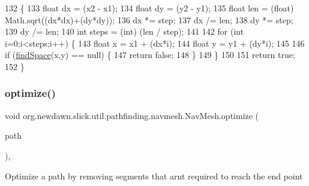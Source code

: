 \begin{DoxyCode}
132                                                                                 \{
133         \textcolor{keywordtype}{float} dx = (x2 - x1);
134         \textcolor{keywordtype}{float} dy = (y2 - y1);
135         \textcolor{keywordtype}{float} len = (float) Math.sqrt((dx*dx)+(dy*dy));
136         dx *= step;
137         dx /= len;
138         dy *= step;
139         dy /= len;
140         \textcolor{keywordtype}{int} steps = (int) (len / step);
141         
142         \textcolor{keywordflow}{for} (\textcolor{keywordtype}{int} i=0;i<steps;i++) \{
143             \textcolor{keywordtype}{float} x = x1 + (dx*i);
144             \textcolor{keywordtype}{float} y = y1 + (dy*i);
145             
146             \textcolor{keywordflow}{if} (\mbox{\hyperlink{classorg_1_1newdawn_1_1slick_1_1util_1_1pathfinding_1_1navmesh_1_1_nav_mesh_a975721b13902b5107ad636ccb1974653}{findSpace}}(x,y) == null) \{
147                 \textcolor{keywordflow}{return} \textcolor{keyword}{false};
148             \}
149         \}
150         
151         \textcolor{keywordflow}{return} \textcolor{keyword}{true};
152     \}
\end{DoxyCode}
\mbox{\label{classorg_1_1newdawn_1_1slick_1_1util_1_1pathfinding_1_1navmesh_1_1_nav_mesh_ae0b7a2d894c694edddba9e83e65f7824}} 
\subsubsection{\texorpdfstring{optimize()}{optimize()}}
{\footnotesize\ttfamily void org.\+newdawn.\+slick.\+util.\+pathfinding.\+navmesh.\+Nav\+Mesh.\+optimize (\begin{DoxyParamCaption}\item[{\mbox{\hyperlink{classorg_1_1newdawn_1_1slick_1_1util_1_1pathfinding_1_1navmesh_1_1_nav_path}{Nav\+Path}}}]{path }\end{DoxyParamCaption})\hspace{0.3cm}{\ttfamily [inline]}, {\ttfamily [private]}}

Optimize a path by removing segments that arn\textquotesingle{}t required to reach the end point


